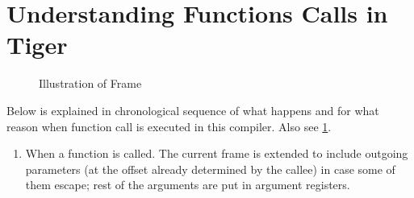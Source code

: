 \section{Understanding Functions Calls in Tiger}


\begin{figure}
	\centering
	\caption{Illustration of Frame}
	\label{fig:myframe}
\end{figure}

Below is explained in chronological sequence of what happens and for
what reason when function call is executed in this compiler. Also see \ref{fig:myframe}.

\begin{enumerate}
	\def\labelenumi{\arabic{enumi}.}
	\item
	      When a function is called. The current frame is extended to include
	      outgoing parameters (at the offset already determined by the callee)
	      in case some of them escape; rest of the arguments are put in argument
	      registers.


\end{enumerate}

